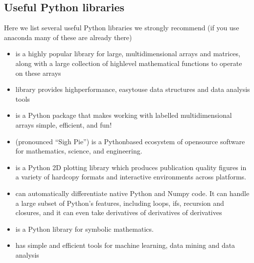 \documentclass[letterpaper,10pt,english]{sphinxmanual}
\begin{document}
\subsection{Useful Python libraries}
\label{\detokenize{chapter2:useful-python-libraries}}
Here we list several useful Python libraries we strongly recommend (if you use anaconda many of these are already there)
\begin{itemize}
\item {} 
 is a highly popular library for large, multi\sphinxhyphen{}dimensional arrays and matrices, along with a large collection of high\sphinxhyphen{}level mathematical functions to operate on these arrays

\item {} 
 library provides high\sphinxhyphen{}performance, easy\sphinxhyphen{}to\sphinxhyphen{}use data structures and data analysis tools

\item {} 
 is a Python package that makes working with labelled multi\sphinxhyphen{}dimensional arrays simple, efficient, and fun!

\item {} 
 (pronounced “Sigh Pie”) is a Python\sphinxhyphen{}based ecosystem of open\sphinxhyphen{}source software for mathematics, science, and engineering.

\item {} 
 is a Python 2D plotting library which produces publication quality figures in a variety of hardcopy formats and interactive environments across platforms.

\item {} 
 can automatically differentiate native Python and Numpy code. It can handle a large subset of Python’s features, including loops, ifs, recursion and closures, and it can even take derivatives of derivatives of derivatives

\item {} 
 is a Python library for symbolic mathematics.

\item {} 
 has simple and efficient tools for machine learning, data mining and data analysis


\end{itemize}
\end{document}
